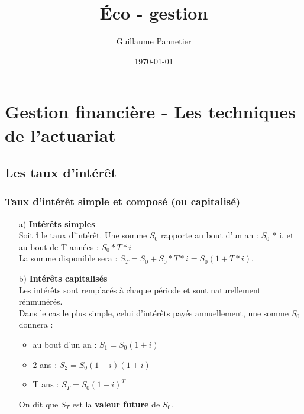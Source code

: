 \documentclass{article}
\begin{document}
\title{
		\'Eco - gestion
	}
\author{Guillaume Pannetier}
\date{\today}

\maketitle

\tableofcontents

\pagebreak



\section{Gestion financière - Les techniques de  l'actuariat}

\subsection{Les taux d'intér\^et}
\subsubsection{Taux d'intér\^et simple et composé (ou capitalisé)}

\begin{enumerate}
	\item[a)] \textbf{Intér\^ets simples}\\
	Soit \textbf{i} le taux d'intér\^et. Une somme \textbf{$S_{0}$} rapporte au bout d'un an : $S_{0}$ * i, et au bout de T années : $S_{0} * T * i$\\
	La somme disponible sera : $S_{T} = S_{0} + S_{0} * T * i = S_{0}(1 + T * i)$.\\
	
	\item[b)] \textbf{Intér\^ets capitalisés}\\
	Les intér\^ets sont remplacés à chaque période et sont naturellement rénmunérés.\\
	Dans le cas le plus simple, celui d'intér\^ets payés annuellement, une somme $S_{0}$ donnera :
	\begin{itemize}
		\item au bout d'un an : $S_{1} = S_{0}(1 + i)$
		\item 2 ans : $S_{2} = S_{0}(1+i)(1+i)$
		\item T ans : $S_{T} = S_{0}(1+i)^{T}$\\
	\end{itemize}
	
	On dit que $S_{T}$ est la \textbf{valeur future} de $S_{0}$.
	
\end{enumerate}
\end{document}
